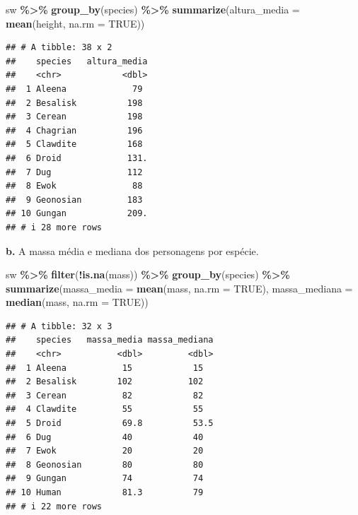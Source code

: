 \documentclass[
]{book}
\newenvironment{Shaded}{\begin{snugshade}}{\end{snugshade}}
\newcommand{\AttributeTok}[1]{\textcolor[rgb]{0.13,0.29,0.53}{#1}}
\newcommand{\ConstantTok}[1]{\textcolor[rgb]{0.56,0.35,0.01}{#1}}
\newcommand{\FunctionTok}[1]{\textcolor[rgb]{0.13,0.29,0.53}{\textbf{#1}}}
\newcommand{\NormalTok}[1]{#1}
\newcommand{\SpecialCharTok}[1]{\textcolor[rgb]{0.81,0.36,0.00}{\textbf{#1}}}
\begin{document}
\begin{Shaded}
\begin{Highlighting}[]
\NormalTok{sw }\SpecialCharTok{\%\textgreater{}\%} 
  \FunctionTok{group\_by}\NormalTok{(species) }\SpecialCharTok{\%\textgreater{}\%} 
  \FunctionTok{summarize}\NormalTok{(}\AttributeTok{altura\_media =} \FunctionTok{mean}\NormalTok{(height, }\AttributeTok{na.rm =} \ConstantTok{TRUE}\NormalTok{))}
\end{Highlighting}
\end{Shaded}

\begin{verbatim}
## # A tibble: 38 x 2
##    species   altura_media
##    <chr>            <dbl>
##  1 Aleena             79 
##  2 Besalisk          198 
##  3 Cerean            198 
##  4 Chagrian          196 
##  5 Clawdite          168 
##  6 Droid             131.
##  7 Dug               112 
##  8 Ewok               88 
##  9 Geonosian         183 
## 10 Gungan            209.
## # i 28 more rows
\end{verbatim}

\textbf{b.} A massa média e mediana dos personagens por espécie.

\begin{Shaded}
\begin{Highlighting}[]
\NormalTok{sw }\SpecialCharTok{\%\textgreater{}\%}
  \FunctionTok{filter}\NormalTok{(}\SpecialCharTok{!}\FunctionTok{is.na}\NormalTok{(mass)) }\SpecialCharTok{\%\textgreater{}\%} 
  \FunctionTok{group\_by}\NormalTok{(species) }\SpecialCharTok{\%\textgreater{}\%} 
  \FunctionTok{summarize}\NormalTok{(}\AttributeTok{massa\_media =} \FunctionTok{mean}\NormalTok{(mass, }\AttributeTok{na.rm =} \ConstantTok{TRUE}\NormalTok{),}
            \AttributeTok{massa\_mediana =} \FunctionTok{median}\NormalTok{(mass, }\AttributeTok{na.rm =} \ConstantTok{TRUE}\NormalTok{))}
\end{Highlighting}
\end{Shaded}

\begin{verbatim}
## # A tibble: 32 x 3
##    species   massa_media massa_mediana
##    <chr>           <dbl>         <dbl>
##  1 Aleena           15            15  
##  2 Besalisk        102           102  
##  3 Cerean           82            82  
##  4 Clawdite         55            55  
##  5 Droid            69.8          53.5
##  6 Dug              40            40  
##  7 Ewok             20            20  
##  8 Geonosian        80            80  
##  9 Gungan           74            74  
## 10 Human            81.3          79  
## # i 22 more rows
\end{verbatim}
\end{document}
